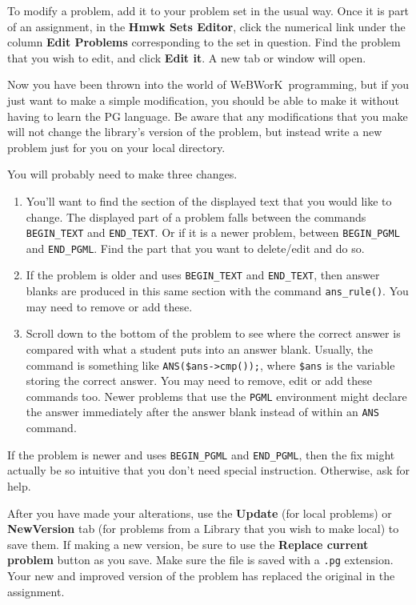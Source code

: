 \documentclass[12pt]{article}
\newcommand{\menu}[1]{\textbf{#1}}
\newcommand{\WW}{WeBWorK}
\newcommand{\HSE}{\menu{Hmwk Sets Editor}}
\begin{document}
To modify a problem, add it to your problem set in the usual way.  Once it is part of an assignment, in the \HSE, click the numerical link under the column \menu{Edit Problems} corresponding to the set in question.  Find the problem that you wish to edit, and click \menu{Edit it}.  A new tab or window will open.

Now you have been thrown into the world of \WW\ programming, but if you just want to make a simple modification, you should be able to make it without having to learn the PG language.  Be aware that any modifications that you make will not change the library's version of the problem, but instead write a new problem just for you on your local directory.

You will probably need to make three changes.  
\begin{enumerate}
\item You'll want to find the section of the displayed text that you would like to change.  The displayed part of a problem falls between the commands \verb=BEGIN_TEXT= and \verb=END_TEXT=. Or if it is a newer problem, between  \verb=BEGIN_PGML= and \verb=END_PGML=. Find the part that you want to delete/edit and do so.

\item If the problem is older and uses \verb=BEGIN_TEXT= and \verb=END_TEXT=, then answer blanks are produced in this same section with the command \verb=ans_rule()=.  You may need to remove or add these.

\item Scroll down to the bottom of the problem to see where the correct answer is compared with what a student puts into an answer blank.  Usually, the command is something like \verb=ANS($ans->cmp());=, where \verb=$ans= is the variable storing the correct answer.  You may need to remove, edit or add these commands too. Newer problems that use the \texttt{PGML} environment might declare the answer immediately after the answer blank instead of within an \texttt{ANS} command.
\end{enumerate}
If the problem is newer and uses \verb=BEGIN_PGML= and \verb=END_PGML=, then the fix might actually be so intuitive that you don't need special instruction. Otherwise, ask for help.

After you have made your alterations, use the \menu{Update} (for local problems) or \menu{NewVersion} tab (for problems from a Library that you wish to make local) to save them. If making a new version, be sure to use the \menu{Replace current problem} button as you save. Make sure the file is saved with a \texttt{.pg} extension.  Your new and improved version of the problem has replaced the original in the assignment.
\end{document}
